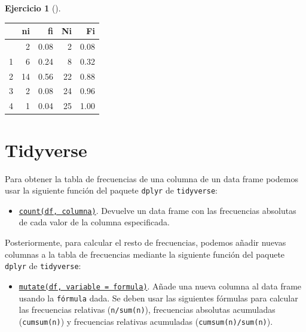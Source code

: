 \documentclass[
  a4paper,
]{scrreport}
\providecommand{\tightlist}{%
  \setlength{\itemsep}{0pt}\setlength{\parskip}{0pt}}\usepackage{longtable,booktabs,array}
\theoremstyle{definition}
\newtheorem{exercise}{Ejercicio}[chapter]
\theoremstyle{remark}
\begin{document}
\begin{exercise}[]
\begin{enumerate}
\begin{tcolorbox}
  \begin{longtable}[]{@{}lrrrr@{}}
  \toprule\noalign{}
  & ni & fi & Ni & Fi \\
  \midrule\noalign{}
  \endhead
  \bottomrule\noalign{}
  \endlastfoot
  0 & 2 & 0.08 & 2 & 0.08 \\
  1 & 6 & 0.24 & 8 & 0.32 \\
  2 & 14 & 0.56 & 22 & 0.88 \\
  3 & 2 & 0.08 & 24 & 0.96 \\
  4 & 1 & 0.04 & 25 & 1.00 \\
  \end{longtable}

  \section{Tidyverse}

  Para obtener la tabla de frecuencias de una columna de un data frame
  podemos usar la siguiente función del paquete \texttt{dplyr} de
  \texttt{tidyverse}:

  \begin{itemize}
  \tightlist
  \item
    \href{https://aprendeconalf.es/manual-r/06-preprocesamiento.html\#conteo-del-n\%C3\%BAmero-de-observaciones}{\texttt{count(df,\ columna)}}.
    Devuelve un data frame con las frecuencias absolutas de cada valor
    de la columna especificada.
  \end{itemize}

  Posteriormente, para calcular el resto de frecuencias, podemos añadir
  nuevas columnas a la tabla de frecuencias mediante la siguiente
  función del paquete \texttt{dplyr} de \texttt{tidyverse}:

  \begin{itemize}
  \tightlist
  \item
    \href{https://dplyr.tidyverse.org/reference/mutate.html}{\texttt{mutate(df,\ variable\ =\ formula)}}.
    Añade una nueva columna al data frame usando la \texttt{fórmula}
    dada. Se deben usar las siguientes fórmulas para calcular las
    frecuencias relativas (\texttt{n/sum(n)}), frecuencias absolutas
    acumuladas (\texttt{cumsum(n)}) y frecuencias relativas acumuladas
    (\texttt{cumsum(n)/sum(n)}).
  \end{itemize}


\end{tcolorbox}
\end{enumerate}
\end{exercise}
\end{document}
